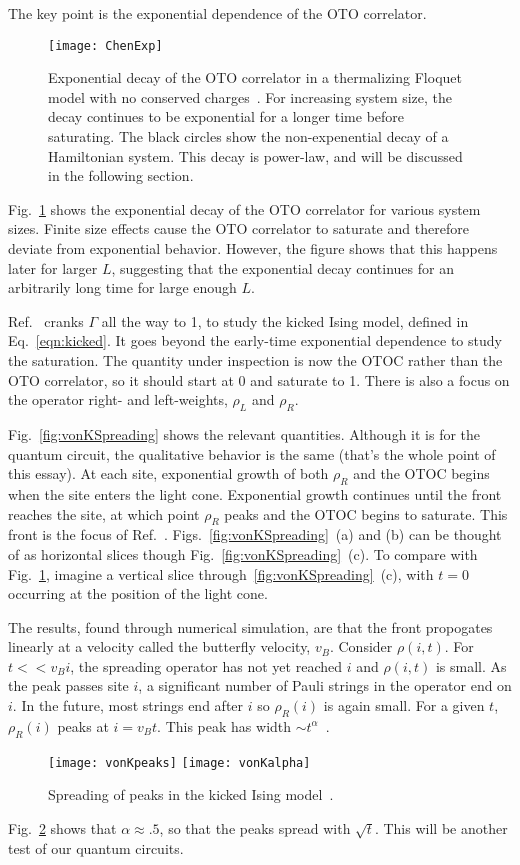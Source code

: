 \documentclass[a4paper,12pt]{article}
\begin{document}
The key point is the exponential dependence of the OTO correlator. 
\begin{figure}
	\centering
	\texttt{[image: ChenExp]}
	\caption{Exponential decay of the OTO correlator in a thermalizing Floquet model with no conserved charges~\cite{ChenOtoc}. For increasing system size, the decay continues to be exponential for a longer time before saturating. The black circles show the non-expenential decay of a Hamiltonian system. This decay is power-law, and will be discussed in the following section.}
	\label{fig:ChenExp}
\end{figure}
Fig.~\ref{fig:ChenExp} shows the exponential decay of the OTO correlator for various system sizes. Finite size effects cause the OTO correlator to saturate and therefore deviate from exponential behavior. However, the figure shows that this happens later for larger $L$, suggesting that the exponential decay continues for an arbitrarily long time for large enough $L$.

Ref.~\cite{vonKeyserlingkHydro} cranks $\Gamma$ all the way to 1, to study the kicked Ising model, defined in Eq.~\ref{eqn:kicked}. It goes beyond the early-time exponential dependence to study the saturation. The quantity under inspection is now the OTOC rather than the OTO correlator, so it should start at 0 and saturate to 1. There is also a focus on the operator right- and left-weights, $\rho_L$ and $\rho_R$.

Fig.~\ref{fig:vonKSpreading} shows the relevant quantities. Although it is for the quantum circuit, the qualitative behavior is the same (that's the whole point of this essay). At each site, exponential growth of both $\rho_R$ and the OTOC begins when the site enters the light cone. Exponential growth continues until the front reaches the site, at which point $\rho_R$ peaks and the OTOC begins to saturate. This front is the focus of Ref.~\cite{vonKeyserlingkHydro}.
Figs.~\ref{fig:vonKSpreading}~(a) and (b) can be thought of as horizontal slices though Fig.~\ref{fig:vonKSpreading}~(c). To compare with Fig.~\ref{fig:ChenExp}, imagine a vertical slice through~\ref{fig:vonKSpreading}~(c), with $t=0$ occurring at the position of the light cone.

The results, found through numerical simulation, are that the front propogates linearly at a velocity called the butterfly velocity, $v_B$. Consider $\rho(i,t)$. For $t<<v_B i$, the spreading operator has not yet reached $i$ and $\rho(i,t)$ is small. As the peak passes site $i$, a significant number of Pauli strings in the operator end on $i$. In the future, most strings end after $i$ so $\rho_R(i)$ is again small. For a given $t$, $\rho_R(i)$ peaks at $i=v_B t$. This peak has width $\sim t^\alpha$~\cite{vonKeyserlingkHydro}.
\begin{figure}
	\centering
	\texttt{[image: vonKpeaks]}
	\texttt{[image: vonKalpha]}
	\caption{Spreading of peaks in the kicked Ising model~\cite{vonKeyserlingkHydro}.}
	\label{fig:vonKalpha}
\end{figure}
Fig.~\ref{fig:vonKalpha} shows that $\alpha\approx .5$, so that the peaks spread with $\sqrt{t}$. This will be another test of our quantum circuits.
\end{document}

